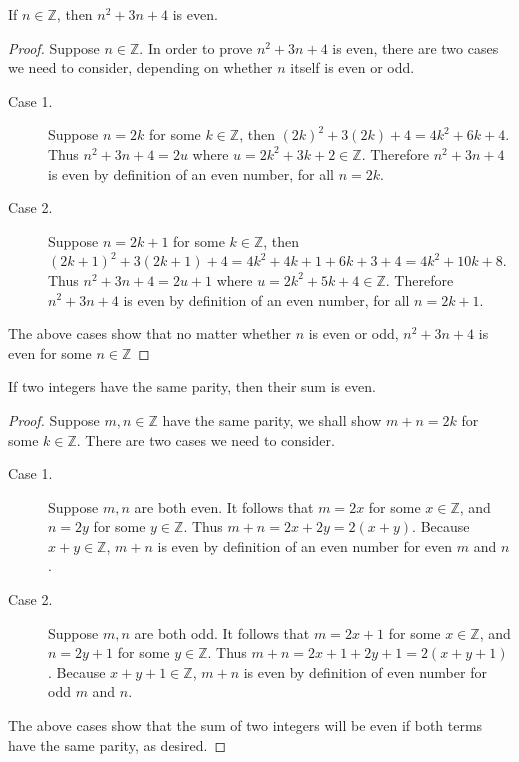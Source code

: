 \documentclass{exam}
\begin{document}
\begin{proposition}{4.15}
    If $n\in\mathbb Z$, then $n^2 + 3n + 4$ is even.
\end{proposition}

\begin{proof}
    Suppose $n \in\mathbb Z$. In order to prove $n^2 + 3n + 4$ is even, there are two cases we need to consider, depending on whether $n$ itself is even or odd.
    \begin{description}
        \item[Case 1.] Suppose $n = 2k$ for some $k\in\mathbb Z$, then $(2k)^2 + 3(2k) + 4 = 4k^2 + 6k + 4$. Thus $n^2 + 3n + 4 = 2u$ where $u = 2k^2 + 3k + 2 \in \mathbb Z$. Therefore $n^2+3n+4$ is even by definition of an even number, for all $n = 2k$.
        \item[Case 2. ] Suppose $n = 2k + 1$ for some $k \in\mathbb Z$, then $(2k + 1)^2 + 3(2k + 1) + 4 = 4k^2 + 4k + 1 + 6k + 3 + 4 = 4k^2 + 10k + 8$. Thus $n^2 + 3n + 4 = 2u + 1$ where $u = 2k^2 + 5k +4 \in \mathbb Z$. Therefore $n^2 + 3n + 4$ is even by definition of an even number, for all $n = 2k + 1$.
    \end{description}

    The above cases show that no matter whether $n$ is even or odd, $n^2 + 3n + 4$ is even for some $n \in \mathbb Z$
\end{proof}

\begin{proposition}{4.16}
    If two integers have the same parity, then their sum is even.
\end{proposition}

\begin{proof}
    Suppose $m, n\in\mathbb Z$ have the same parity, we shall show $m + n = 2k$ for some $k \in\mathbb{Z}$. There are two cases we need to consider.
    \begin{description}
        \item[Case 1. ] Suppose $m, n$ are both even. It follows that $m = 2x$ for some $x \in\mathbb Z$, and $n = 2y$ for some $y \in\mathbb Z$. Thus $m + n = 2x + 2y = 2(x+y)$. Because $x + y \in\mathbb Z$, $m + n$ is even by definition of an even number for even $m$ and $n$.
        \item[Case 2. ] Suppose $m, n$ are both odd. It follows that $m = 2x + 1$ for some $x \in\mathbb Z$, and $n = 2y + 1$ for some $y \in\mathbb Z$.  Thus $m + n = 2x + 1 + 2y + 1 = 2(x + y + 1)$. Because $x + y + 1 \in\mathbb Z$, $m + n$ is even by definition of even number for odd $m$ and $n$.
    \end{description}

    The above cases show that the sum of two integers will be even if both terms have the same parity, as desired.
\end{proof}
\end{document}
